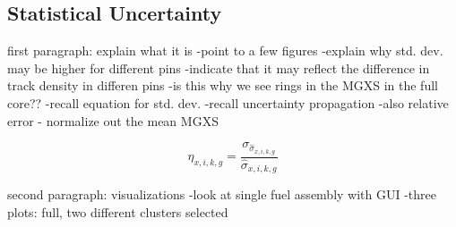 \subsection{Statistical Uncertainty}
\label{subsec:chap10-stat-uncertainty}

first paragraph: explain what it is
-point to a few figures
-explain why std. dev. may be higher for different pins
-indicate that it may reflect the difference in track density in differen pins
  -is this why we see rings in the \ac{MGXS} in the full core??
-recall equation for std. dev.
-recall uncertainty propagation
-also relative error - normalize out the mean \ac{MGXS}

\begin{equation}
\label{eqn:chap10-rel-err}
\eta_{x,i,k,g} = \frac{\sigma_{\hat{\sigma}_{x,i,k,g}}}{\hat{\sigma}_{x,i,k,g}}
\end{equation}

second paragraph: visualizations
-look at single fuel assembly with GUI
-three plots: full, two different clusters selected

